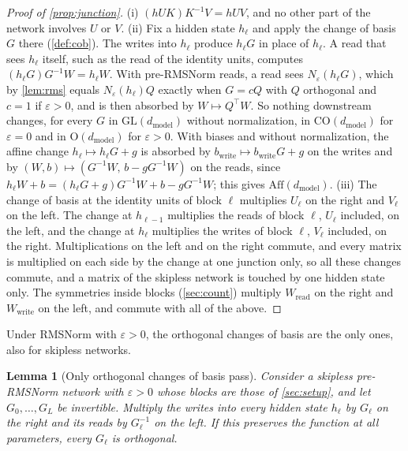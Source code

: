 \documentclass[10pt]{article}
\newtheorem{lemma}[theorem]{Lemma}
\theoremstyle{definition}
\theoremstyle{remark}
\newcommand{\Wread}{W_{\mathrm{read}}}
\newcommand{\Wwrite}{W_{\mathrm{write}}}
\newcommand{\dm}{d_{\mathrm{model}}}
\newcommand{\GL}{\mathrm{GL}}
\newcommand{\Ort}{\mathrm{O}}
\newcommand{\CO}{\mathrm{CO}}
\newcommand{\Aff}{\mathrm{Aff}}
\begin{document}
\begin{proof}[Proof of \cref{prop:junction}]
(i) $(hUK)K^{-1}V = hUV$, and no other part of the network involves $U$ or $V$.
(ii) Fix a hidden state $h_{\ell}$ and apply the change of basis $G$ there (\cref{def:cob}). The writes into $h_{\ell}$ produce $h_\ell G$ in place of $h_\ell$. A read that sees $h_\ell$ itself, such as the read of the identity units, computes $(h_\ell G)G^{-1}W = h_\ell W$. With pre-RMSNorm reads, a read sees $N_\varepsilon(h_\ell G)$, which by \cref{lem:rms} equals $N_\varepsilon(h_\ell)Q$ exactly when $G = cQ$ with $Q$ orthogonal and $c = 1$ if $\varepsilon > 0$, and is then absorbed by $W \mapsto Q^\top W$. So nothing downstream changes, for every $G$ in $\GL(\dm)$ without normalization, in $\CO(\dm)$ for $\varepsilon = 0$ and in $\Ort(\dm)$ for $\varepsilon > 0$. With biases and without normalization, the affine change $h_\ell \mapsto h_\ell G + g$ is absorbed by $b_{\mathrm{write}} \mapsto b_{\mathrm{write}}G + g$ on the writes and by $(W, b) \mapsto (G^{-1}W,\, b - gG^{-1}W)$ on the reads, since $h_\ell W + b = (h_\ell G + g)G^{-1}W + b - gG^{-1}W$; this gives $\Aff(\dm)$.
(iii) The change of basis at the identity units of block $\ell$ multiplies $U_\ell$ on the right and $V_\ell$ on the left. The change at $h_{\ell-1}$ multiplies the reads of block $\ell$, $U_\ell$ included, on the left, and the change at $h_\ell$ multiplies the writes of block $\ell$, $V_\ell$ included, on the right. Multiplications on the left and on the right commute, and every matrix is multiplied on each side by the change at one junction only, so all these changes commute, and a matrix of the skipless network is touched by one hidden state only. The symmetries inside blocks (\cref{sec:count}) multiply $\Wread$ on the right and $\Wwrite$ on the left, and commute with all of the above.
\end{proof}

Under RMSNorm with $\varepsilon > 0$, the orthogonal changes of basis are the only ones, also for skipless networks.

\begin{lemma}[Only orthogonal changes of basis pass]\label{lem:onlyorth}
Consider a skipless pre-RMSNorm network with $\varepsilon > 0$ whose blocks are those of \cref{sec:setup}, and let $G_0, \dots, G_L$ be invertible. Multiply the writes into every hidden state $h_\ell$ by $G_\ell$ on the right and its reads by $G_\ell^{-1}$ on the left. If this preserves the function at all parameters, every $G_\ell$ is orthogonal.
\end{lemma}
\end{document}
